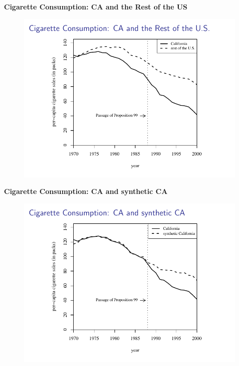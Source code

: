 \documentclass[notes=show]{beamer}
\begin{document}
\begin{frame}[plain]
	\begin{center}
	\textbf{Cigarette Consumption: CA and the Rest of the US}
	\end{center}
	
	\begin{figure}
	\includegraphics[scale=0.75]{./lecture_includes/abadie_3.pdf}
	\end{figure}
\end{frame}

\begin{frame}[plain]
	\begin{center}
	\textbf{Cigarette Consumption: CA and synthetic CA}
	\end{center}
	
	\begin{figure}
	\includegraphics[scale=0.75]{./lecture_includes/abadie_4.pdf}
	\end{figure}
\end{frame}
\end{document}

